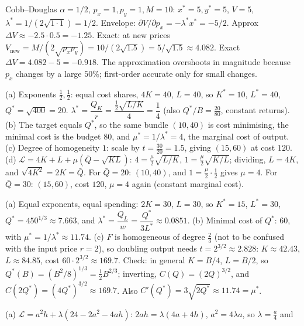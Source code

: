 \begin{solutions}
  \item Cobb--Douglas $\alpha = 1/2$, $p_x = 1, p_y = 1, M = 10$:
        $x^* = 5, y^* = 5$, $V = 5$,
        $\lambda^* = 1/(2 \sqrt{1 \cdot 1}) = 1/2$. Envelope:
        $\partial V/\partial p_x = -\lambda^* x^* = -5/2$. Approx
        $\Delta V \approx -2.5 \cdot 0.5 = -1.25$. Exact: at new prices
        $V_{\text{new}} = M/(2 \sqrt{p_x p_y}) = 10/(2 \sqrt{1.5})
        = 5/\sqrt{1.5} \approx 4.082$. Exact
        $\Delta V = 4.082 - 5 = -0.918$. The approximation overshoots in
        magnitude because $p_x$ changes by a large $50\%$; first-order
        accurate only for small changes.

  \item (a) Exponents $\tfrac12,\tfrac12$: equal cost shares, $4K=40$,
        $L=40$, so $K^*=10$, $L^*=40$, $Q^*=\sqrt{400}=20$.
        $\lambda^*=\dfrac{Q_K}{r}=\dfrac{\tfrac12\sqrt{L/K}}{4}=\dfrac{1}{4}$
        (also $Q^*/B=\tfrac{20}{80}$, constant returns).
        (b) The target equals $Q^*$, so the same bundle $(10,40)$ is cost
        minimising, the minimal cost is the budget $80$, and
        $\mu^*=1/\lambda^*=4$, the marginal cost of output.
        (c) Degree of homogeneity $1$: scale by $t=\tfrac{30}{20}=1.5$, giving
        $(15,60)$ at cost $120$.
        (d) $\mathcal{L}=4K+L+\mu(\bar Q-\sqrt{KL})$:
        $4=\tfrac{\mu}{2}\sqrt{L/K}$, $1=\tfrac{\mu}{2}\sqrt{K/L}$; dividing,
        $L=4K$, and $\sqrt{4K^{2}}=2K=\bar Q$. For $\bar Q=20$: $(10,40)$,
        and $1=\tfrac{\mu}{2}\cdot\tfrac12$ gives $\mu=4$. For $\bar Q=30$:
        $(15,60)$, cost $120$, $\mu=4$ again (constant marginal cost).
  \item (a) Equal exponents, equal spending: $2K=30$, $L=30$, so
        $K^*=15$, $L^*=30$, $Q^*=450^{1/3}\approx7.663$, and
        $\lambda^*=\dfrac{Q_L}{w}=\dfrac{Q^*}{3L^*}\approx0.0851$.
        (b) Minimal cost of $Q^*$: $60$, with $\mu^*=1/\lambda^*\approx11.74$.
        (c) $F$ is homogeneous of degree $\tfrac23$ (not to be confused with
        the input price $r=2$), so doubling output
        needs $t=2^{3/2}\approx2.828$: $K\approx42.43$, $L\approx84.85$, cost
        $60\cdot2^{3/2}\approx169.7$. Check: in general $K=B/4$, $L=B/2$, so
        $Q^*(B)=(B^{2}/8)^{1/3}=\tfrac12B^{2/3}$; inverting,
        $C(Q)=(2Q)^{3/2}$, and $C(2Q^*)=(4Q^*)^{3/2}\approx169.7$. Also
        $C'(Q^*)=3\sqrt{2Q^*}\approx11.74=\mu^*$. \checkmark
  \item (a) $\mathcal{L}=a^{2}h+\lambda(24-2a^{2}-4ah)$:
        $2ah=\lambda(4a+4h)$, $a^{2}=4\lambda a$, so $\lambda=\tfrac a4$ and

\end{solutions}
